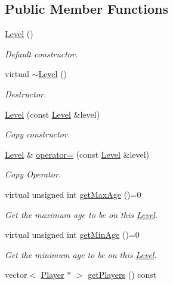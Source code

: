 \subsection*{Public Member Functions}
\begin{DoxyCompactItemize}
\item 
\hyperlink{class_level_a7a696c928ca5d5354db6e50e46d0f67d}{Level} ()
\begin{DoxyCompactList}\small\item\em Default constructor. \end{DoxyCompactList}\item 
virtual \hyperlink{class_level_a249eac1e8f19ff44134efa5e986feaca}{$\sim$\+Level} ()
\begin{DoxyCompactList}\small\item\em Destructor. \end{DoxyCompactList}\item 
\hyperlink{class_level_a098e3e980b18013bf7f0683acbe5e2f6}{Level} (const \hyperlink{class_level}{Level} \&level)
\begin{DoxyCompactList}\small\item\em Copy constructor. \end{DoxyCompactList}\item 
\hyperlink{class_level}{Level} \& \hyperlink{class_level_a60eb04b65c900ae8dddf3d6251fac7b1}{operator=} (const \hyperlink{class_level}{Level} \&level)
\begin{DoxyCompactList}\small\item\em Copy Operator. \end{DoxyCompactList}\item 
virtual unsigned int \hyperlink{class_level_ae7b28ba0cb8d49372c4657fbe42706e1}{get\+Max\+Age} ()=0
\begin{DoxyCompactList}\small\item\em Get the maximum age to be on this \hyperlink{class_level}{Level}. \end{DoxyCompactList}\item 
virtual unsigned int \hyperlink{class_level_a161cf8c238fd499c112d90504cb6f587}{get\+Min\+Age} ()=0
\begin{DoxyCompactList}\small\item\em Get the minimum age to be on this \hyperlink{class_level}{Level}. \end{DoxyCompactList}\item 
vector$<$ \hyperlink{class_player}{Player} $\ast$ $>$ \hyperlink{class_level_a51ff82259c62111618aed20f96ec9f88}{get\+Players} () const

\end{DoxyCompactItemize}
